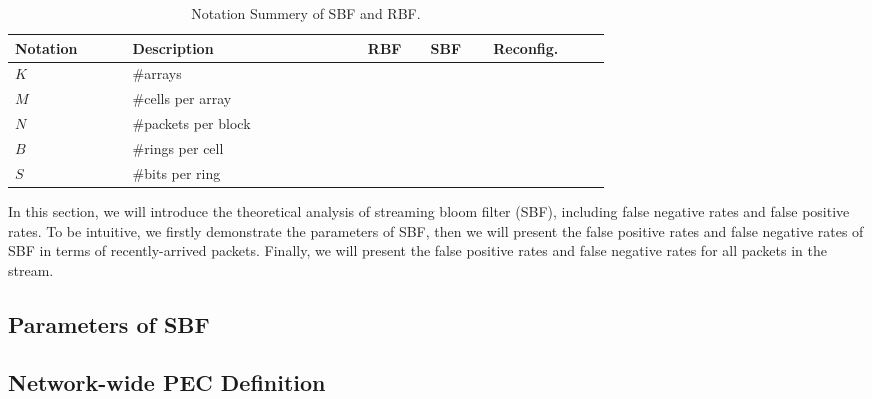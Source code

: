 \begin{table}
\small
\centering
\caption{Notation Summery of SBF and RBF.}
\label{tbl:primitive-actions}
\begin{tabular}{|m{0.15\linewidth}|m{0.30\linewidth}|m{0.08\linewidth}|m{0.08\linewidth}|m{0.15\linewidth}|}

\hline
\textbf{Notation} & \textbf{Description} & \textbf{RBF} & \textbf{SBF} & \textbf{Reconfig.} \\
\hline
\hline

$K$ & \#arrays & \Y & \Y & \N \\
\hline
$M$ & \#cells per array & \Y & \Y & \N \\ 
\hline
$N$ & \#packets per block & \Y & \Y & \Y \\
\hline
$B$ & \#rings per cell & \N & \Y & \Y \\ 
\hline
$S$ & \#bits per ring & \Y & \Y & \Y \\
\hline



\end{tabular}

\end{table}


In this section, we will introduce the theoretical analysis of streaming bloom filter (SBF), including false negative rates and false positive rates. To be intuitive, we firstly demonstrate the parameters of SBF, then we will present the false positive rates and false negative rates of SBF in terms of recently-arrived packets. Finally, we will present the false positive rates and false negative rates for all packets in the stream.

\subsection{Parameters of SBF}

\subsection{Network-wide PEC Definition}

\subsection{}


